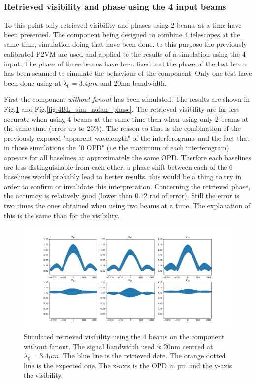 \subsubsection{Retrieved visibility and phase using the 4 input beams}
To this point only retrieved visibility and phases using 2 beams at a time have been presented. The component being designed to combine 4 telescopes at the same time, simulation doing that have been done. to this purpose the previously calibrated P2VM are used and applied to the results of a simulation using the 4 input. The phase of three beams have been fixed and the phase of the last beam has been scanned to simulate the behaviour of the component. Only one test have been done using at $\lambda_0=3.4 \mu m$ and 20nm bandwidth. 

First the component \emph{without fanout} has been simulated. The results are shown in Fig.\ref{fig:4BL_sim_nofan} and Fig.\ref{fig:4BL_sim_nofan_phase}. The retrieved visibility are far less accurate when using 4 beams at the same time than when using only 2 beams at the same time (error up to 25\%). The reason to that is the combination of the previously exposed "apparent wavelength" of the interferograms and the fact that in those simulations the "0 OPD" (i.e the maximum of each interferogram) appears for all baselines at approximately the same OPD. Therfore each baselines are less distinguishable from each-other, a phase shift between each of the 6 baselines would probably lead to better results, this would be a thing to try in order to confirm or invalidate this interpretation.
Concerning the retrieved phase, the accuracy is relatively good (lower than 0.12 rad of error). Still the error is two times the ones obtained when using two beams at a time. The explanation of this is the same than for the visibility.

\begin{figure}[htbp!]
\centering
\includegraphics[scale=.4]{../picture/4BL_20_nofan.pdf}
\caption{Simulated retrieved visibility using the 4 beams on the component without fanout. The signal bandwidth used is 20nm centred at $ \lambda_0=3.4 \mu m$. The blue line is the retrieved date. The orange dotted line is the expected one. The x-axis is the OPD in µm and the y-axis the visibility.}
\label{fig:4BL_sim_nofan}
\end{figure}


